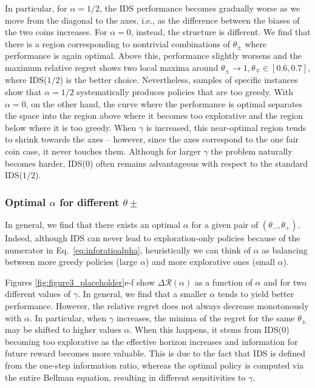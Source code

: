 \documentclass[aps,nofootinbib,groupaddress,superscriptaddress,reprint,amsmath,amssymb,graphicx,onecolumn,prx]{revtex4-2}
\begin{document}
In particular, for $\alpha=1/2$, the IDS performance becomes gradually worse as we move from the diagonal to the axes, i.e., as the difference between the biases of the two coins increases. For $\alpha=0$, instead, the structure is different. We find that there is a region corresponding to nontrivial combinations of $\theta_\pm$ where performance is again optimal. Above this, performance slightly worsens and the maximum relative regret shows two local maxima around $\theta_\pm\to1, \theta_\mp \in [0.6,0.7]$, where IDS($1/2$) is the better choice. Nevertheless, samples of specific instances show that $\alpha=1/2$ systematically produces policies that are too greedy. With $\alpha=0$, on the other hand, the curve where the performance is optimal separates the space into the region above where it becomes too explorative and the region below where it is too greedy. When $\gamma$ is increased, this near-optimal region tends to shrink towards the axes -- however, since the axes correspond to the one fair coin case, it never touches them. Although for larger $\gamma$ the problem naturally becomes harder, IDS($0$) often remains advantageous with respect to the standard IDS($1/2$).

\subsubsection{Optimal $\alpha$ for different $\theta\pm$}
\noindent In general, we find that there exists an optimal $\alpha$ for a given pair of $(\theta_-, \theta_+)$. Indeed, although IDS can never lead to exploration-only policies because of the numerator in Eq.~\eqref{eq:inforatioalpha}, heuristically we can think of $\alpha$ as balancing between more greedy policies (large $\alpha$) and more explorative ones (small $\alpha$).

Figures \ref{fig:figure3_placeholder}e-f show $\Delta \mathcal{R}(\alpha)$ as a function of $\alpha$ and for two different values of $\gamma$. In general, we find that a smaller $\alpha$ tends to yield better performance. However, the relative regret does not always decrease monotonously with $\alpha$. In particular, when $\gamma$ increases, the minima of the regret for the same $\theta_\pm$ may be shifted to higher values $\alpha$. When this happens, it stems from IDS($0$) becoming too explorative as the effective horizon increases and information for future reward becomes more valuable. This is due to the fact that IDS is defined from the one-step information ratio, whereas the optimal policy is computed via the entire Bellman equation, resulting in different sensitivities to $\gamma$.
\end{document}
